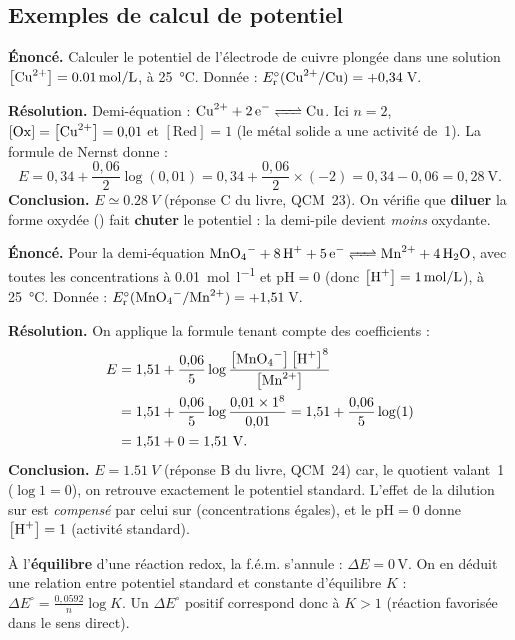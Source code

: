 \documentclass[11pt,a4paper]{article}
\newcommand{\degner}[1]{\ensuremath{E_{\mathrm{r}}^{\circ}(#1)}}  %
\newcommand{\cc}[1]{\left[#1\right]}            %
\newcommand{\fem}{\ensuremath{\Delta E}}        %
\begin{document}
\subsection{Exemples de calcul de potentiel}

\begin{exemple}
\textbf{Énoncé.} Calculer le potentiel de l'électrode de cuivre plongée dans une solution
$\cc{\ce{Cu^{2+}}}=\SI{0.01}{mol\per\litre}$, à \SI{25}{\celsius}. Donnée :
$\degner{\ce{Cu^{2+}}/\ce{Cu}}=+0{,}34$\,V.

\textbf{Résolution.} Demi-équation : $\ce{Cu^{2+} + 2 e^- <=> Cu}$. Ici $n=2$,
$[\mathrm{Ox}]=\cc{\ce{Cu^{2+}}}=0{,}01$ et $[\mathrm{Red}]=1$ (le métal solide  a une
activité de~1). La formule de Nernst donne :
\[
E=0{,}34+\frac{0{,}06}{2}\log(0{,}01)=0{,}34+\frac{0{,}06}{2}\times(-2)
=0{,}34-0{,}06=0{,}28\ \mathrm{V}.
\]
\textbf{Conclusion.} $E\simeq\SI{0.28}{V}$ (réponse C du livre, QCM~23). On vérifie que
\textbf{diluer} la forme oxydée () fait \textbf{chuter} le potentiel : la demi-pile
devient \emph{moins} oxydante.
\end{exemple}

\begin{exemple}
\textbf{Énoncé.} Pour la demi-équation
$\ce{MnO4^- + 8 H+ + 5 e^- <=> Mn^{2+} + 4 H2O}$, avec toutes les concentrations à
\SI{0.01}{mol\per\litre} et $\mathrm{pH}=0$ (donc $\cc{\ce{H+}}=\SI{1}{mol\per\litre}$), à
\SI{25}{\celsius}. Donnée : $\degner{\ce{MnO4^-}/\ce{Mn^{2+}}}=+1{,}51$\,V.

\textbf{Résolution.} On applique la formule tenant compte des coefficients :
\begin{align*}
E &=1{,}51+\frac{0{,}06}{5}\log\frac{\cc{\ce{MnO4^-}}\cc{\ce{H+}}^{8}}{\cc{\ce{Mn^{2+}}}}\\
  &=1{,}51+\frac{0{,}06}{5}\log\frac{0{,}01\times1^{8}}{0{,}01}
   =1{,}51+\frac{0{,}06}{5}\log(1)\\
  &=1{,}51+0=1{,}51\ \mathrm{V}.
\end{align*}
\textbf{Conclusion.} $E=\SI{1.51}{V}$ (réponse B du livre, QCM~24) car, le quotient valant~1
($\log 1=0$), on retrouve exactement le potentiel standard. L'effet de la dilution sur 
est \emph{compensé} par celui sur  (concentrations égales), et le $\mathrm{pH}=0$ donne
$\cc{\ce{H+}}=1$ (activité standard).
\end{exemple}

\begin{remarque}
À l'\textbf{équilibre} d'une réaction redox, la f.é.m. s'annule : $\fem=0$\,V. On en déduit une
relation entre potentiel standard et constante d'équilibre $K$ :
$\fem^{\circ}=\tfrac{0{,}0592}{n}\log K$. Un $\fem^{\circ}$ positif correspond donc à $K>1$
(réaction favorisée dans le sens direct).
\end{remarque}
\end{document}
